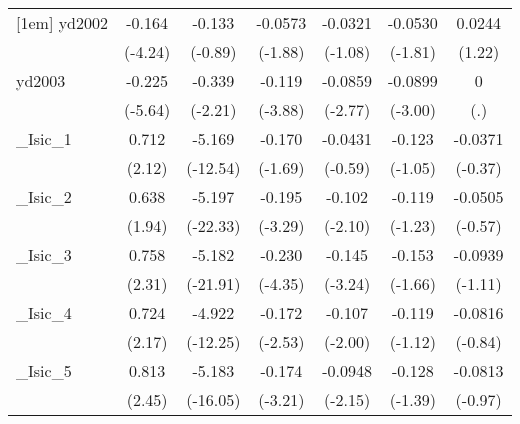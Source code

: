 \begin{table}[htbp]
\begin{tabular}{l*{6}{c}}
[1em]
yd2002      &      -0.164\sym{***}&      -0.133         &     -0.0573         &     -0.0321         &     -0.0530         &      0.0244         \\
            &     (-4.24)         &     (-0.89)         &     (-1.88)         &     (-1.08)         &     (-1.81)         &      (1.22)         \\
[1em]
yd2003      &      -0.225\sym{***}&      -0.339\sym{*}  &      -0.119\sym{***}&     -0.0859\sym{**} &     -0.0899\sym{**} &           0         \\
            &     (-5.64)         &     (-2.21)         &     (-3.88)         &     (-2.77)         &     (-3.00)         &         (.)         \\
[1em]
\_Isic\_1     &       0.712\sym{*}  &      -5.169\sym{***}&      -0.170         &     -0.0431         &      -0.123         &     -0.0371         \\
            &      (2.12)         &    (-12.54)         &     (-1.69)         &     (-0.59)         &     (-1.05)         &     (-0.37)         \\
[1em]
\_Isic\_2     &       0.638         &      -5.197\sym{***}&      -0.195\sym{**} &      -0.102\sym{*}  &      -0.119         &     -0.0505         \\
            &      (1.94)         &    (-22.33)         &     (-3.29)         &     (-2.10)         &     (-1.23)         &     (-0.57)         \\
[1em]
\_Isic\_3     &       0.758\sym{*}  &      -5.182\sym{***}&      -0.230\sym{***}&      -0.145\sym{**} &      -0.153         &     -0.0939         \\
            &      (2.31)         &    (-21.91)         &     (-4.35)         &     (-3.24)         &     (-1.66)         &     (-1.11)         \\
[1em]
\_Isic\_4     &       0.724\sym{*}  &      -4.922\sym{***}&      -0.172\sym{*}  &      -0.107\sym{*}  &      -0.119         &     -0.0816         \\
            &      (2.17)         &    (-12.25)         &     (-2.53)         &     (-2.00)         &     (-1.12)         &     (-0.84)         \\
[1em]
\_Isic\_5     &       0.813\sym{*}  &      -5.183\sym{***}&      -0.174\sym{**} &     -0.0948\sym{*}  &      -0.128         &     -0.0813         \\
            &      (2.45)         &    (-16.05)         &     (-3.21)         &     (-2.15)         &     (-1.39)         &     (-0.97)         \\

\end{tabular}
\end{table}
